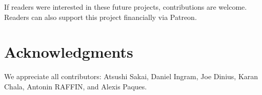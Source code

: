 \documentclass{bmvc2k}
\begin{document}
If readers were interested in these future projects, contributions are welcome.
Readers can also support this project financially via Patreon\cite{patreon}.

\section{Acknowledgments}

We appreciate all contributors: Atsushi Sakai\cite{auther6}, Daniel Ingram\cite{auther1}, Joe Dinius\cite{auther2}, Karan Chala\cite{auther3}, Antonin RAFFIN\cite{auther4}, and Alexis Paques\cite{auther6}.



\end{document}
